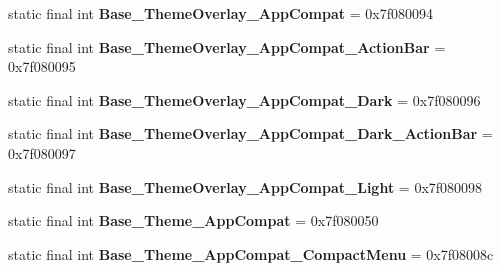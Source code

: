 \begin{DoxyCompactItemize}
\item 
\hypertarget{classandroid_1_1support_1_1v7_1_1appcompat_1_1_r_1_1style_ae4b85b193267b846c5a1c56dad179d1c}{}static final int {\bfseries Base\+\_\+\+Theme\+Overlay\+\_\+\+App\+Compat} = 0x7f080094\label{classandroid_1_1support_1_1v7_1_1appcompat_1_1_r_1_1style_ae4b85b193267b846c5a1c56dad179d1c}

\item 
\hypertarget{classandroid_1_1support_1_1v7_1_1appcompat_1_1_r_1_1style_a65e1bb81ae73752bcc8d4bf7e97a14dd}{}static final int {\bfseries Base\+\_\+\+Theme\+Overlay\+\_\+\+App\+Compat\+\_\+\+Action\+Bar} = 0x7f080095\label{classandroid_1_1support_1_1v7_1_1appcompat_1_1_r_1_1style_a65e1bb81ae73752bcc8d4bf7e97a14dd}

\item 
\hypertarget{classandroid_1_1support_1_1v7_1_1appcompat_1_1_r_1_1style_a3e8cd9266f191c0fc16f3473f8891e6a}{}static final int {\bfseries Base\+\_\+\+Theme\+Overlay\+\_\+\+App\+Compat\+\_\+\+Dark} = 0x7f080096\label{classandroid_1_1support_1_1v7_1_1appcompat_1_1_r_1_1style_a3e8cd9266f191c0fc16f3473f8891e6a}

\item 
\hypertarget{classandroid_1_1support_1_1v7_1_1appcompat_1_1_r_1_1style_a24212e31d5a8f471486aaef0c26a2345}{}static final int {\bfseries Base\+\_\+\+Theme\+Overlay\+\_\+\+App\+Compat\+\_\+\+Dark\+\_\+\+Action\+Bar} = 0x7f080097\label{classandroid_1_1support_1_1v7_1_1appcompat_1_1_r_1_1style_a24212e31d5a8f471486aaef0c26a2345}

\item 
\hypertarget{classandroid_1_1support_1_1v7_1_1appcompat_1_1_r_1_1style_ad811f28779abf2944bb85a604e57c055}{}static final int {\bfseries Base\+\_\+\+Theme\+Overlay\+\_\+\+App\+Compat\+\_\+\+Light} = 0x7f080098\label{classandroid_1_1support_1_1v7_1_1appcompat_1_1_r_1_1style_ad811f28779abf2944bb85a604e57c055}

\item 
\hypertarget{classandroid_1_1support_1_1v7_1_1appcompat_1_1_r_1_1style_a8e435bd44b683737594e2074394d738e}{}static final int {\bfseries Base\+\_\+\+Theme\+\_\+\+App\+Compat} = 0x7f080050\label{classandroid_1_1support_1_1v7_1_1appcompat_1_1_r_1_1style_a8e435bd44b683737594e2074394d738e}

\item 
\hypertarget{classandroid_1_1support_1_1v7_1_1appcompat_1_1_r_1_1style_a0c56917b296881cef762400b9c529cd6}{}static final int {\bfseries Base\+\_\+\+Theme\+\_\+\+App\+Compat\+\_\+\+Compact\+Menu} = 0x7f08008c\label{classandroid_1_1support_1_1v7_1_1appcompat_1_1_r_1_1style_a0c56917b296881cef762400b9c529cd6}


\end{DoxyCompactItemize}
